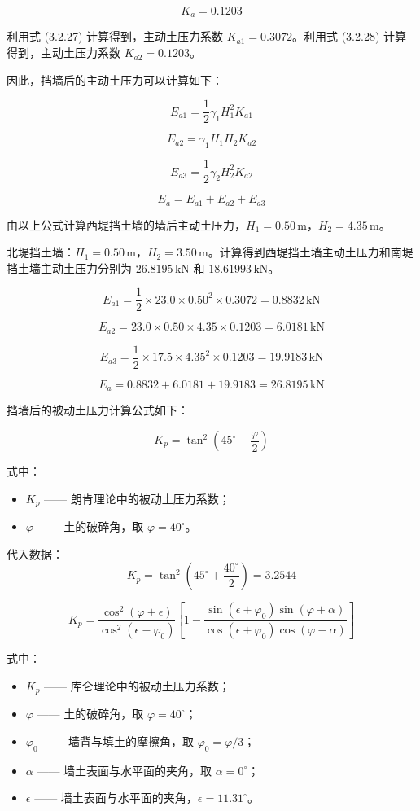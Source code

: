 \documentclass[UTF8, a4paper, 12pt]{ctexart} %
\begin{document}
\[
K_a = 0.1203
\]

利用式 (3.2.27) 计算得到，主动土压力系数 $K_{a1} = 0.3072$。利用式 (3.2.28) 计算得到，主动土压力系数 $K_{a2} = 0.1203$。

因此，挡墙后的主动土压力可以计算如下：

\[
E_{a1} = \frac{1}{2} \gamma_1 H_1^2 K_{a1} \tag{3.24}
\]

\[
E_{a2} = \gamma_1 H_1 H_2 K_{a2} \tag{3.25}
\]

\[
E_{a3} = \frac{1}{2} \gamma_2 H_2^2 K_{a2} \tag{3.26}
\]

\[
E_a = E_{a1} + E_{a2} + E_{a3} \tag{3.27}
\]

由以上公式计算西堤挡土墙的墙后主动土压力，$H_1 = 0.50\,\text{m}$，$H_2 = 4.35\,\text{m}$。

北堤挡土墙：$H_1 = 0.50\,\text{m}$，$H_2 = 3.50\,\text{m}$。计算得到西堤挡土墙主动土压力和南堤挡土墙主动土压力分别为 $26.8195\,\text{kN}$ 和 $18.61993\,\text{kN}$。

\[
E_{a1} = \frac{1}{2} \times 23.0 \times 0.50^2 \times 0.3072 = 0.8832\,\text{kN}
\]

\[
E_{a2} = 23.0 \times 0.50 \times 4.35 \times 0.1203 = 6.0181\,\text{kN}
\]

\[
E_{a3} = \frac{1}{2} \times 17.5 \times 4.35^2 \times 0.1203 = 19.9183\,\text{kN}
\]

\[
E_a = 0.8832 + 6.0181 + 19.9183 = 26.8195\,\text{kN}
\]


挡墙后的被动土压力计算公式如下：

\[
K_p = \tan^2 \left( 45^\circ + \frac{\varphi}{2} \right) \tag{3.28}
\]

式中：
\begin{itemize}
    \item $K_p$ —— 朗肯理论中的被动土压力系数；
    \item $\varphi$ —— 土的破碎角，取 $\varphi = 40^\circ$。
\end{itemize}

代入数据：
\[
K_p = \tan^2 \left( 45^\circ + \frac{40^\circ}{2} \right) = 3.2544
\]

\[
K_p = \frac{\cos^2 (\varphi + \epsilon)}{\cos^2 (\epsilon - \varphi_0)} 
\left[ 
1 - \frac{\sin (\epsilon + \varphi_0) \sin (\varphi + \alpha)}{\cos (\epsilon + \varphi_0) \cos (\varphi - \alpha)}
\right] \tag{3.29}
\]

式中：
\begin{itemize}
    \item $K_p$ —— 库仑理论中的被动土压力系数；
    \item $\varphi$ —— 土的破碎角，取 $\varphi = 40^\circ$；
    \item $\varphi_0$ —— 墙背与填土的摩擦角，取 $\varphi_0 = \varphi / 3$；
    \item $\alpha$ —— 墙土表面与水平面的夹角，取 $\alpha = 0^\circ$；
    \item $\epsilon$ —— 墙土表面与水平面的夹角，$\epsilon = 11.31^\circ$。
\end{itemize}
\end{document}
